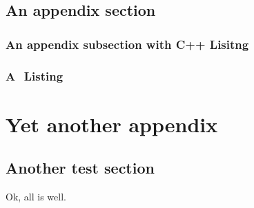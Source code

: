 \documentclass[a4paper,11pt]{MScThesis}
\begin{document}
    \section{An appendix section}

    \subsection{An appendix subsection with C++ Lisitng}

    \lstset{language=C++}
    

    \subsection{A \matlab $ $ Listing}

    \lstset{language=matlab}
    

    \chapter{Yet another appendix}

    \section{Another test section}

    Ok, all is well.

    \printindex
    \cleardoublepage
\end{document}
